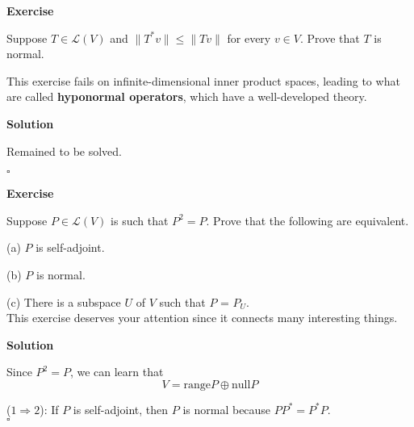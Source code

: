 \documentclass{article}
\newenvironment{exercise}{%
{\textbf{Exercise\\}
    }
}{
}
\newenvironment{solution}{%
{
    \textbf{Solution\\}
    }
}{
  \hfill $\square$ 
  \par\bigskip 
}
\newcommand{\range}{\text{range}}
\newcommand{\n}{\text{null}}
\begin{document}
\begin{CJK}{UTF8}{gkai}
\begin{exercise}
    Suppose $T \in \mathcal{L}(V)$ and $\|T^\ast v\| \leq \|Tv\|$ for every $v \in  V$. Prove that $T$ is normal.

    This exercise fails on infinite-dimensional inner product spaces, leading to what are called \textbf{hyponormal operators}, which have a well-developed theory.
\end{exercise}

\begin{solution}
    Remained to be solved.
\end{solution}

\begin{exercise}
    Suppose $P \in \mathcal{L}(V)$ is such that $P^2 = P$. Prove that the following are equivalent.

    (a) $P$ is self-adjoint.

    (b) $P$ is normal.

    (c) There is a subspace $U$ of $V$ such that $P$ = $P_U$.\\

    This exercise deserves your attention since it connects many interesting things.
\end{exercise}

\begin{solution}
    Since $P^2 = P$, we can learn that 
    \begin{equation}
        V = \range P \oplus \n P
    \end{equation}

    ($1 \Rightarrow 2$):
    If $P$ is self-adjoint, then $P$ is normal because $PP^* = P^*P$.\\


\end{solution}
\end{CJK}
\end{document}
